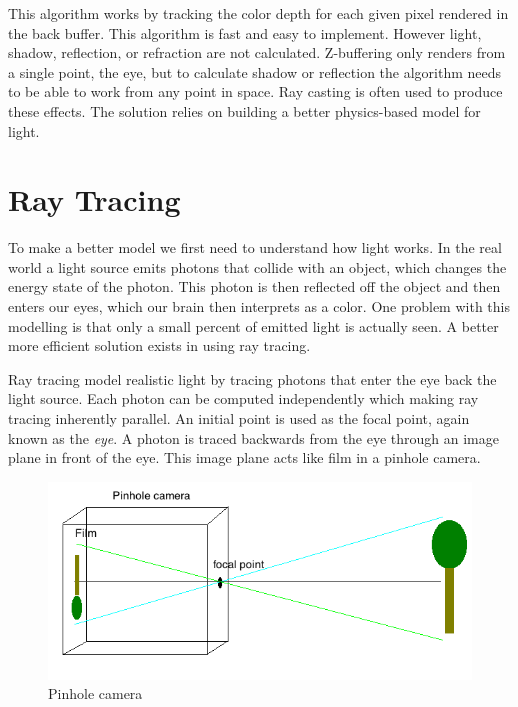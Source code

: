 \documentclass[11pt,a4paper,oneside]{article}
\begin{document}
This algorithm works by tracking the color depth for each given pixel rendered in the back buffer.  This algorithm is fast and easy to implement.  However light, shadow, reflection, or refraction are not calculated.   Z-buffering only renders from a single point, the eye, but to calculate shadow or reflection the algorithm needs to be able to work from any point in space.  Ray casting is often used to produce these effects.  The solution relies on building a better physics-based model for light.

\section{Ray Tracing}

To make a better model we first need to understand how light works.  In the real world a light source emits photons that collide with an object, which changes the energy state of the photon.  This photon is then reflected off the object and then enters our eyes, which our brain then interprets as a color.  One problem with this modelling is that only a small percent of emitted light is actually seen.  A better more efficient solution exists in using ray tracing.  

Ray tracing model realistic light by tracing photons that enter the eye back the light source.  Each photon can be computed independently which making ray tracing inherently parallel.  An initial point is used as the focal point, again known as the \textit{eye}.  A photon is traced backwards from the eye through an image plane in front of the eye.  This image plane acts like film in a pinhole camera.  

\begin{figure}[H]
\begin{center}
\includegraphics[scale=0.6]{pineholecamera.png} 
\caption{Pinhole camera}
\label{pinhole-camera}
\end{center}
\end{figure}
\end{document}
